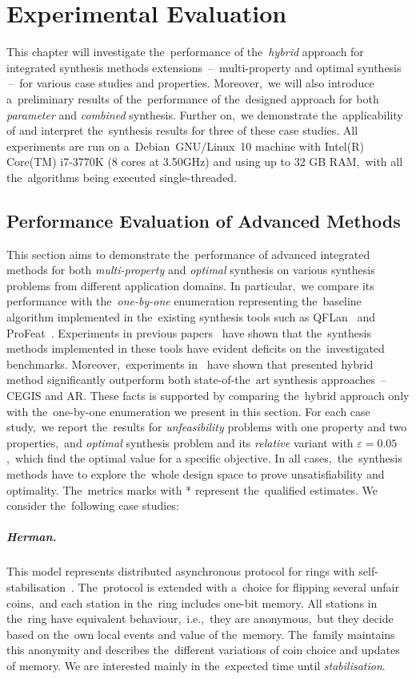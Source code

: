 \chapter{Experimental Evaluation}\label{chap:experiments}
This chapter will investigate the~performance of the~\emph{hybrid} approach for integrated synthesis methods extensions \,--\, multi-property and optimal synthesis \,--\, for various case studies and properties.
Moreover,~we will also introduce a~preliminary results of the~performance of the~designed approach for both \emph{parameter} and \emph{combined} synthesis.
Further on,~we demonstrate the~applicability of \toolname{} and interpret the~synthesis results for three of these case studies.
All experiments are run on a~Debian~GNU/Linux~10 machine with Intel(R) Core(TM) i7-3770K (8 cores at 3.50GHz) and using up to 32 GB RAM,~with all the~algorithms being executed single-threaded.

\section{Performance Evaluation of Advanced Methods}
This section aims to demonstrate the~performance of advanced integrated methods for both \textit{multi-property} and \textit{optimal} synthesis on various synthesis problems from different application domains.
In particular,~we compare its performance with the~\emph{one-by-one} enumeration representing the~baseline algorithm implemented in the~existing synthesis tools such as QFLan~\cite{qflan} and ProFeat~\cite{profeat}.
Experiments in previous papers~\cite{cegar,cegis} have shown that the~synthesis methods implemented in these tools have evident deficits on the~investigated benchmarks.
Moreover,~experiments in~\cite{roman-DP} have shown that presented hybrid method significantly outperform both state-of-the~art synthesis approaches \,--\, CEGIS and AR.
These facts is supported by comparing the~hybrid approach only with the~one-by-one enumeration we present in this section.
For each case study,~we report the~results for \textit{unfeasibility} problems with one property and two properties,~and \textit{optimal} synthesis problem and its \textit{relative} variant with $\varepsilon = 0.05$,~which find the optimal value for a specific objective.
In all cases,~the~synthesis methods have to explore the~whole design space to prove unsatisfiability and optimality.
The~metrics marks with * represent the~qualified estimates.
We consider the~following case studies:

\paragraph{Herman.}
This model represents distributed asynchronous protocol for rings with self-stabilisation~\cite{herman1,herman2}.
The~protocol is extended with a~choice for flipping several unfair coins,~and each station in the~ring includes one-bit memory.
All stations in the~ring have equivalent behaviour,~i.e.,~they are anonymous,~but they decide based on the~own local events and value of the~memory.
The~family maintains this anonymity and describes the~different variations of coin choice and updates of memory.
We are interested mainly in the~expected time until \emph{stabilisation}.
    
